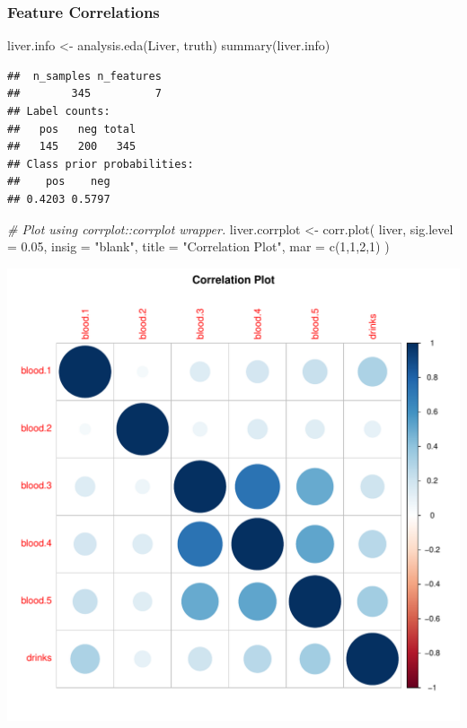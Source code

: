 \documentclass[
  11pt,
  a4paper,
]{scrartcl}
\newenvironment{Shaded}{\begin{snugshade}}{\end{snugshade}}
\newcommand{\AttributeTok}[1]{\textcolor[rgb]{0.77,0.63,0.00}{#1}}
\newcommand{\CommentTok}[1]{\textcolor[rgb]{0.56,0.35,0.01}{\textit{#1}}}
\newcommand{\DecValTok}[1]{\textcolor[rgb]{0.00,0.00,0.81}{#1}}
\newcommand{\FloatTok}[1]{\textcolor[rgb]{0.00,0.00,0.81}{#1}}
\newcommand{\FunctionTok}[1]{\textcolor[rgb]{0.00,0.00,0.00}{#1}}
\newcommand{\NormalTok}[1]{#1}
\newcommand{\OtherTok}[1]{\textcolor[rgb]{0.56,0.35,0.01}{#1}}
\newcommand{\StringTok}[1]{\textcolor[rgb]{0.31,0.60,0.02}{#1}}
\begin{document}
\newpage

\hypertarget{feature-correlations}{%
\subsubsection{Feature Correlations}\label{feature-correlations}}

\begin{Shaded}
\begin{Highlighting}[]
\NormalTok{liver.info }\OtherTok{\textless{}{-}} \FunctionTok{analysis.eda}\NormalTok{(Liver, truth)}
\FunctionTok{summary}\NormalTok{(liver.info)}
\end{Highlighting}
\end{Shaded}

\begin{verbatim}
##  n_samples n_features 
##        345          7 
## Label counts: 
##   pos   neg total 
##   145   200   345 
## Class prior probabilities: 
##    pos    neg 
## 0.4203 0.5797
\end{verbatim}

\begin{Shaded}
\begin{Highlighting}[]
\CommentTok{\# Plot using corrplot::corrplot wrapper.}
\NormalTok{liver.corrplot }\OtherTok{\textless{}{-}} \FunctionTok{corr.plot}\NormalTok{(}
\NormalTok{  liver, }\AttributeTok{sig.level =} \FloatTok{0.05}\NormalTok{, }\AttributeTok{insig =} \StringTok{"blank"}\NormalTok{,}
  \AttributeTok{title =} \StringTok{"Correlation Plot"}\NormalTok{,}
  \AttributeTok{mar =} \FunctionTok{c}\NormalTok{(}\DecValTok{1}\NormalTok{,}\DecValTok{1}\NormalTok{,}\DecValTok{2}\NormalTok{,}\DecValTok{1}\NormalTok{)}
\NormalTok{)}
\end{Highlighting}
\end{Shaded}

\begin{center}\includegraphics{figure/analysis-eda-corrplot-1} \end{center}
\end{document}
